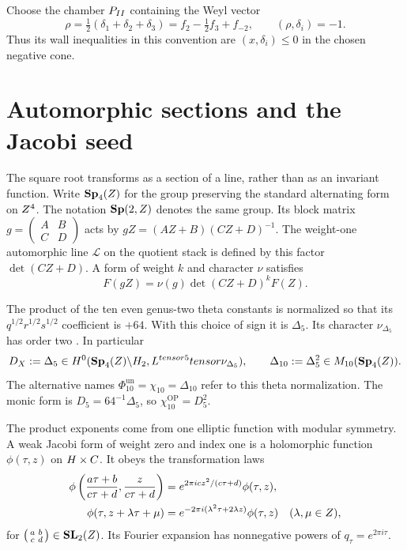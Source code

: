 Choose the chamber
\(P_{II}\) containing the Weyl vector
\[
 \rho=\tfrac12(\delta_1+\delta_2+\delta_3)
      =f_2-\tfrac12f_3+f_{-2},\qquad (\rho,\delta_i)=-1.
\]
Thus its wall inequalities in this convention are
\((x,\delta_i)\leq0\) in the chosen negative cone.

\section{Automorphic sections and the Jacobi seed}
\label{sec:retained-e3-five-readings}

The square root transforms as a section of a line, rather than as
an invariant function. Write \(\mathbf{Sp}_4(Z)\) for the group preserving
the standard alternating form on \(Z^4\). The notation
\(\mathbf{Sp}(2,Z)\) denotes the same group. Its block matrix
\(g=\left(\begin{smallmatrix}A&B\\C&D\end{smallmatrix}\right)\)
acts by \(gZ=(AZ+B)(CZ+D)^{-1}\).
The weight-one automorphic line \(\mathcal L\) on the quotient
stack is defined by this factor \(\det(CZ+D)\).
A form of weight \(k\) and character \(\nu\) satisfies
\[
 F(gZ)=\nu(g)\det(CZ+D)^kF(Z).
\]

The product of the ten even genus-two theta constants is normalized
so that its \(q^{1/2}r^{1/2}s^{1/2}\) coefficient is \(+64\).
With this choice of sign it is \(\Delta_5\).
Its character \(\nu_{\Delta_5}\) has order two
\cite{Igusa1962,MAASS:1}. In particular
\[
 D_X:=\Delta_5\in
 H^0(\mathbf{Sp}_4(Z)\backslash H_2,
       L^{tensor5}tensor\nu_{\Delta_5}),\qquad
 \Delta_{10}:=\Delta_5^2\in M_{10}(\mathbf{Sp}_4(Z)).
\]
The alternative names \(\Phi_{10}^{\mathrm{un}}=\chi_{10}=\Delta_{10}\)
refer to this theta normalization. The monic form is
\(D_5=64^{-1}\Delta_5\), so \(\chi_{10}^{\mathrm{OP}}=D_5^2\).

The product exponents come from one elliptic function with modular
symmetry. A weak Jacobi form of weight zero and index one is a
holomorphic function \(\phi(\tau,z)\) on \(H\times C\).
It obeys the transformation laws
\begin{align*}
 \phi\left(\frac{a\tau+b}{c\tau+d},\frac{z}{c\tau+d}\right)
 &=e^{2\pi i cz^2/(c\tau+d)}\phi(\tau,z),\\
 \phi(\tau,z+\lambda\tau+\mu)
 &=e^{-2\pi i(\lambda^2\tau+2\lambda z)}\phi(\tau,z)
 \quad(\lambda,\mu\in Z),
\end{align*}
for \(\left(\begin{smallmatrix}a&b\\c&d\end{smallmatrix}\right)
\in\mathbf{SL}_2(Z)\). Its Fourier expansion has nonnegative powers
of \(q_\tau=e^{2\pi i\tau}\).

